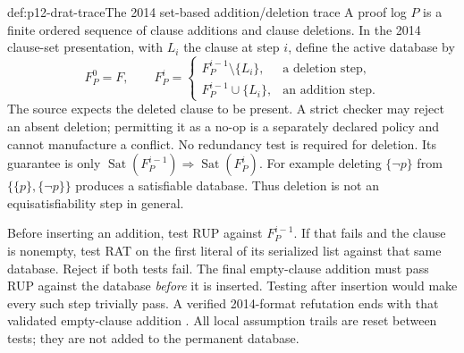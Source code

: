 \begin{hbdefinition}{def:p12-drat-trace}{The 2014 set-based addition/deletion trace}
A proof log \(P\) is a finite ordered sequence of clause additions and
clause deletions.  In the 2014 clause-set presentation, with \(L_i\) the
clause at step \(i\), define the active database by
\[
 F^0_P=F,\qquad
 F^i_P=
 \begin{cases}
  F^{i-1}_P\setminus\{L_i\},&\text{a deletion step},\\
  F^{i-1}_P\cup\{L_i\},&\text{an addition step}.
 \end{cases}
\]
The source expects the deleted clause to be present.  A strict checker may
reject an absent deletion; permitting it as a no-op is a separately declared
policy and cannot manufacture a conflict.  No redundancy test is required
for deletion.  Its guarantee is only
\(\operatorname{Sat}(F^{i-1}_P)\Rightarrow\operatorname{Sat}(F^i_P)\).
For example deleting \(\{\neg p\}\) from
\(\{\{p\},\{\neg p\}\}\) produces a satisfiable database.
Thus deletion is not an equisatisfiability step in general.

Before inserting an addition, test RUP against \(F^{i-1}_P\).  If that
fails and the clause is nonempty, test RAT on the first literal of its
serialized list against that same database.  Reject if both tests fail.
The final empty-clause addition must pass RUP against the database
\emph{before} it is inserted.  Testing after insertion would make every such
step trivially pass.  A verified 2014-format refutation ends with that
validated empty-clause addition \cite[Sec.~3 and Fig.~1]{WetzlerHeuleHunt2014AuthorDRAT}.
All local assumption trails are reset between tests; they are not added to
the permanent database.
\end{hbdefinition}

